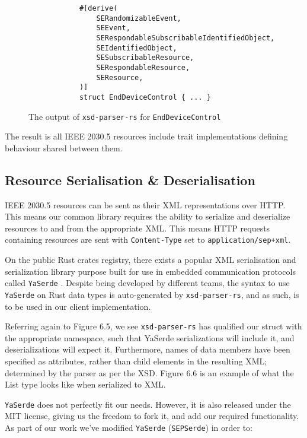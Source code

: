 \begin{figure}[H]
    \begin{center}
        \begin{lstlisting}
            #[derive(
                SERandomizableEvent,
                SEEvent,
                SERespondableSubscribableIdentifiedObject,
                SEIdentifiedObject,
                SESubscribableResource,
                SERespondableResource,
                SEResource,
            )]
            struct EndDeviceControl { ... }
        \end{lstlisting}
        \label{fig:edctraits}
        \caption{The output of \texttt{xsd-parser-rs} for \texttt{EndDeviceControl}}
    \end{center}
\end{figure}

The result is all IEEE 2030.5 resources include trait implementations defining behaviour shared between them. 



\subsection{Resource Serialisation \& Deserialisation}
IEEE 2030.5 resources can be sent as their XML representations over HTTP. This means our common library requires the ability to serialize and deserialize resources to and from the appropriate XML.
This means HTTP requests containing resources are sent with \texttt{Content-Type} set to \texttt{application/sep+xml}.

On the public Rust crates registry, there exists a popular XML serialisation and serialization library purpose built for use in embedded communication protocols called \texttt{YaSerde} \cite[]{YaSerde}.
Despite being developed by different teams, the syntax to use \texttt{YaSerde} on Rust data types is auto-generated by \texttt{xsd-parser-rs}, and as such, is to be used in our client implementation.

Referring again to Figure 6.5, we see \texttt{xsd-parser-rs} has qualified our struct with the appropriate namespace, such that YaSerde serializations will include it, and deserializations will expect it.
Furthermore, names of data members have been specified as attributes, rather than child elements in the resulting XML; determined by the parser as per the XSD.
Figure 6.6 is an example of what the List type looks like when serialized to XML.

\texttt{YaSerde} does not perfectly fit our needs. However, it is also released under the MIT license, giving us the freedom to fork it, and add our required functionality.
As part of our work we've modified \texttt{YaSerde} (\texttt{SEPSerde}) in order to:

